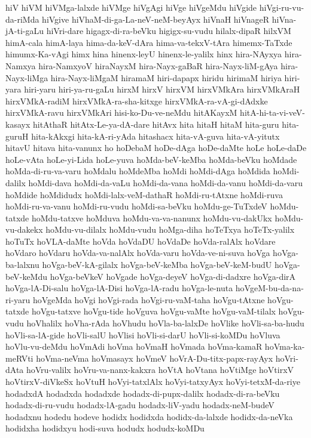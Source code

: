 {hiV
hiVM
hiVMga-lalxde
hiVMge
hiVgAgi
hiVge
hiVgeMdu
hiVgide
hiVgi-ru-vu-da-riMda
hiVgive
hiVhaM-di-ga-La-neV-neM-beyAyx
hiVnaH
hiVnageR
hiVna-jA-ti-gaLu
hiVri-dare
higagx-di-ra-beVku
higigx-su-vudu
hilalx-dipaR
hilxVM
himA-cala
himA-laya
hima-da-keV-dAra
hima-va-tekxV-tAra
himemx-TaTxde
himumx-Ka-vAgi
himx
hina
hinenx-leyU
hinenx-le-yalilx
hinx
hira-NAyxya
hira-Namxya
hira-NamxyoV
hiraNayxM
hira-Nayx-gaBaR
hira-Nayx-liM-gAya
hira-Nayx-liMga
hira-Nayx-liMgaM
hiramaM
hiri-dapapx
hiridu
hirimaM
hiriya
hiri-yara
hiri-yaru
hiri-ya-ru-gaLu
hirxM
hirxV
hirxVM
hirxVMkAra
hirxVMkAraH
hirxVMkA-radiM
hirxVMkA-ra-sha-kitxge
hirxVMkA-ra-vA-gi-dAdxke
hirxVMkA-ravu
hirxVMkAri
hisi-ko-Du-ve-neMdu
hitAKayxM
hitA-hi-ta-vi-veV-kasayx
hitAthaR
hitAtx-Le-ya-dA-dare
hitAvx
hita
hitaH
hitaM
hita-guru
hita-guruH
hita-kAkxgi
hita-kA-ri-yAda
hitashacx
hita-vA-guva
hita-vA-yitutx
hitavU
hitava
hita-vanunx
ho
hoDebaM
hoDe-dAga
hoDe-daMte
hoLe
hoLe-daDe
hoLe-vAta
hoLe-yi-Lida
hoLe-yuva
hoMda-beV-keMba
hoMda-beVku
hoMdade
hoMda-di-ru-va-varu
hoMdalu
hoMdeMba
hoMdi
hoMdi-dAga
hoMdida
hoMdi-dalilx
hoMdi-dava
hoMdi-da-vaLu
hoMdi-da-vana
hoMdi-da-vanu
hoMdi-da-varu
hoMdide
hoMdidudx
hoMdi-lalx-veM-dathaR
hoMdi-ru-tAtxne
hoMdi-ruva
hoMdi-ru-va-vanu
hoMdi-ru-vudu
hoMdi-sa-beVku
hoMdu-ge-TuTxdeV
hoMdu-tatxde
hoMdu-tatxve
hoMduva
hoMdu-va-va-nanunx
hoMdu-vu-dakUkx
hoMdu-vu-dakekx
hoMdu-vu-dilalx
hoMdu-vudu
hoMga-diha
hoTeTxya
hoTeTx-yalilx
hoTuTx
hoVLA-daMte
hoVda
hoVdaDU
hoVdaDe
hoVda-ralAlx
hoVdare
hoVdaro
hoVdaru
hoVda-va-nalAlx
hoVda-varu
hoVda-ve-ni-suva
hoVga
hoVga-ba-lalxnu
hoVga-beV-kA-gilalx
hoVga-beV-keMba
hoVga-beV-keM-budU
hoVga-beV-keMdu
hoVga-beVkeV
hoVgade
hoVga-deyeV
hoVga-di-dadxre
hoVga-dirA
hoVga-lA-Di-salu
hoVga-lA-Disi
hoVga-lA-radu
hoVga-le-nuta
hoVgeM-bu-da-na-ri-yaru
hoVgeMda
hoVgi
hoVgi-rada
hoVgi-ru-vaM-taha
hoVgu-tAtxne
hoVgu-tatxde
hoVgu-tatxve
hoVgu-tide
hoVguva
hoVgu-vaMte
hoVgu-vaM-tilalx
hoVgu-vudu
hoVhalilx
hoVha-rAda
hoVhudu
hoVla-ba-lalxDe
hoVlike
hoVli-sa-ba-hudu
hoVli-sa-lA-gide
hoVli-salU
hoVlisi
hoVli-si-darU
hoVli-si-koMDu
hoVluva
hoVlu-vu-deMdu
hoVmAdi
hoVma
hoVmaH
hoVmada
hoVma-kamaR
hoVma-ka-meRVti
hoVma-neVma
hoVmasayx
hoVmeV
hoVrA-Du-titx-papx-rayAyx
hoVri-dAta
hoVru-valilx
hoVru-va-nanx-kakxra
hoVtA
hoVtana
hoVtiMge
hoVtirxV
hoVtirxV-diVkeSx
hoVtuH
hoVyi-tatxlAlx
hoVyi-tatxyAyx
hoVyi-tetxM-da-riye
hodadxdA
hodadxda
hodadxde
hodadx-di-pupx-dalilx
hodadx-di-ra-beVku
hodadx-di-ru-vudu
hodadx-lA-gadu
hodadx-liV-yadu
hodadx-neM-budeV
hodadxnu
hodedu
hodeve
hodidx
hodidxda
hodidx-da-lalxde
hodidx-da-neVka
hodidxha
hodidxyu
hodi-suva
hodudx
hodudx-koMDu
}
